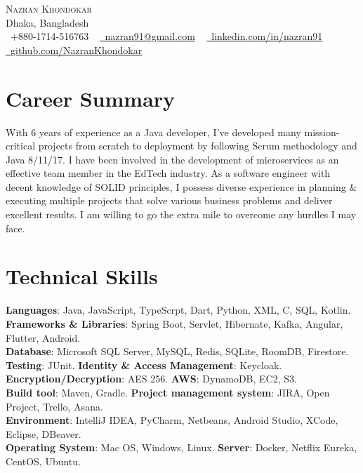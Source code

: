 \documentclass[letterpaper,11pt]{article}
\begin{document}

\begin{center}
    {\Huge \scshape Nazran Khondokar} \\ \vspace{1pt}
    Dhaka, Bangladesh \\ \vspace{1pt}
    \small \raisebox{-0.1\height}\faPhone\ +880-1714-516763 ~ \href{mailto:nazran91@gmail.com}{\raisebox{-0.2\height}\faEnvelope\  \underline{nazran91@gmail.com}} ~ 
    \href{https://www.linkedin.com/in/nazran91/}{\raisebox{-0.2\height}\faLinkedin\ \underline{linkedin.com/in/nazran91}}  ~
    \href{https://github.com/NazranKhondokar/}{\raisebox{-0.2\height}\faGithub\ \underline{github.com/NazranKhondokar}}
    \vspace{-8pt}
\end{center}

\section{Career Summary}
With 6 years of experience as a Java developer, I’ve developed many mission-critical projects from scratch to deployment by following Scrum methodology and Java 8/11/17. I have been involved in the development of microservices as an effective team member in the EdTech industry. As a software engineer with decent knowledge of SOLID principles, I possess diverse experience in planning \& executing multiple projects that solve various business problems and deliver excellent results. I am willing to go the extra mile to overcome any hurdles I may face.
            

%
\section{Technical Skills}
 \begin{itemize}[leftmargin=0.15in, label={}]
    \small{\item{
     \textbf{Languages}{: Java, JavaScript, TypeScrpt, Dart, Python, XML, C, SQL, Kotlin.} \\
     \textbf{Frameworks \& Libraries}{: Spring Boot, Servlet, Hibernate, Kafka, Angular, Flutter, Android.}\\
     \textbf{Database}{: Microsoft SQL Server, MySQL, Redis, SQLite, RoomDB, Firestore.}\\
     \textbf{Testing}{: JUnit.}
     \textbf{Identity \& Access Management}{: Keycloak.}\\
     \textbf{Encryption/Decryption}{: AES 256.}
     \textbf{AWS}{: DynamoDB, EC2, S3.}\\
     \textbf{Build tool}{: Maven, Gradle.}
     \textbf{Project management system}{: JIRA, Open Project, Trello, Asana.}\\
     \textbf{Environment}{: IntelliJ IDEA, PyCharm, Netbeans, Android Studio, XCode, Eclipse, DBeaver.}\\
     \textbf{Operating System}{: Mac OS, Windows, Linux.}
     \textbf{Server}{: Docker, Netflix Eureka, CentOS, Ubuntu.}
    }}
 \end{itemize}
 \vspace{-16pt}
\end{document}
